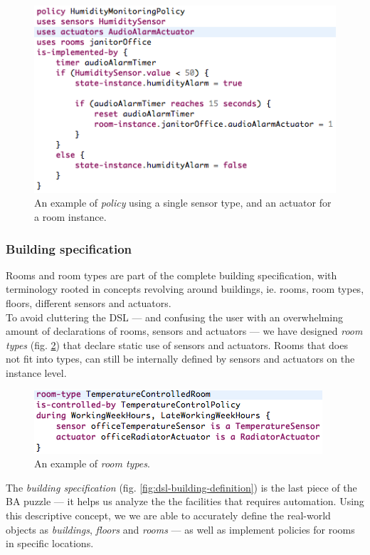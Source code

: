 \begin{figure}[h]
  \centering
    \includegraphics[scale=.5]{dsl-policy-definition.png} 
	\caption{An example of \textit{policy} using a single sensor type, and an actuator for a room instance.}
	\label{fig:dsl-policy-definition}
\end{figure}

\newpage
\subsubsection{Building specification}\label{subsec:buildingspecification}
Rooms and room types are part of the complete building specification, with terminology rooted in concepts revolving around buildings, ie. rooms, room types, floors, different sensors and actuators. \\

To avoid cluttering the DSL --- and confusing the user with an overwhelming amount of declarations of rooms, sensors and actuators --- we have designed \textit{room types} (fig. \ref{fig:room-types}) that declare static use of sensors and actuators. Rooms that does not fit into types, can still be internally defined by sensors and actuators on the instance level.

\begin{figure}
  \centering
    \includegraphics[scale=.5]{dsl-room-types.png}
	\caption{An example of \textit{room types}.}
	\label{fig:room-types}
\end{figure}

The \textit{building specification} (fig. \ref{fig:dsl-building-definition}) is the last piece of the BA puzzle --- it helps us analyze the the facilities that requires automation. Using this descriptive concept, we we are able to accurately define the real-world objects as \textit{buildings}, \textit{floors} and \textit{rooms} --- as well as implement policies for rooms in specific locations. 

